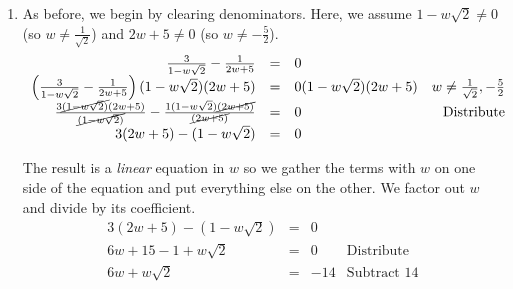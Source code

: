 \documentclass{ximera}
\begin{document}
\begin{example}
\begin{explanation}
\begin{enumerate}
\[\begin{array}{rclr}
t & = & 0, \; -\frac{1}{2} \text{ or } 1 & \\

\end{array}\] We assumed that $t \neq 1$ in order to clear denominators.  Sure enough, the candidate $t = 1$ doesn't check in the original equation since it causes division by $0$.  In this case, we call $t = 1$ an \textit{extraneous} solution.  Note that $t=1$ \textit{does} work in every equation \textit{after} we clear denominators.  In general, multiplying by variable expressions can produce these `extra' solutions, which is why checking our answers is always encouraged.\footnote{Contrast this with what happened in  Example \ref{solveeqnbyfactoring} when we divided by a variable and `lost' a solution.}  The other two candidates, $t = 0$ and $t = -\frac{1}{2}$, are solutions.

\item  As before, we begin by clearing denominators.  Here, we assume $1 - w\sqrt{2} \neq 0$ (so $w \neq \frac{1}{\sqrt{2}}$) and $2w+5 \neq 0$ (so $w \neq -\frac{5}{2}$).\[ \begin{array}{rclr}

 \frac{3}{1 - w\sqrt{2}} - \frac{1}{2w+5} & = &  0 & \\

\left(\frac{3}{1 - w\sqrt{2}} - \frac{1}{2w+5}\right)(1 - w\sqrt{2})(2w+5) & = &  0 (1 - w\sqrt{2})(2w+5)  & w \neq \frac{1}{\sqrt{2}}, -\frac{5}{2} \\  

\frac{3\cancel{(1 - w\sqrt{2})}(2w+5) }{\cancel{(1 - w\sqrt{2})}}- \frac{1(1 - w\sqrt{2})\cancel{(2w+5)}}{\cancel{(2w+5)}} & = & 0 & \text{Distribute} \\  

3(2w+5) - (1-w\sqrt{2}) & = & 0 & \\  \end{array}\]

The result is a \textit{linear} equation in $w$ so we gather the terms with $w$ on one side of the equation and put everything else on the other.  We factor out $w$ and divide by its coefficient. \[ \begin{array}{rclr}

3(2w+5) - (1-w\sqrt{2}) & = & 0 & \\

6w + 15 - 1 + w\sqrt{2} & = & 0 & \text{Distribute} \\

6w + w\sqrt{2} & = & -14 & \text{Subtract $14$} \\


\end{array}\]
\end{enumerate}
\end{explanation}
\end{example}
\end{document}
